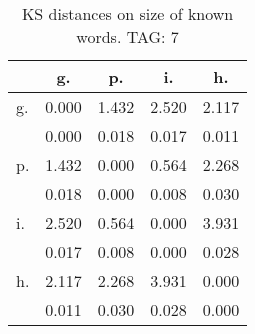 \begin{table}[h!]
\begin{center}
\begin{tabular}{| l | c | c | c | c |}\hline
 & g. & p. & i. & h. \\\hline
g. & 0.000  & 1.432  & 2.520  & 2.117 \\\hline
 & 0.000  & 0.018  & 0.017  & 0.011 \\\hline
p. & 1.432  & 0.000  & 0.564  & 2.268 \\\hline
 & 0.018  & 0.000  & 0.008  & 0.030 \\\hline
i. & 2.520  & 0.564  & 0.000  & 3.931 \\\hline
 & 0.017  & 0.008  & 0.000  & 0.028 \\\hline
h. & 2.117  & 2.268  & 3.931  & 0.000 \\\hline
 & 0.011  & 0.030  & 0.028  & 0.000 \\\hline
\end{tabular}
\caption{KS distances on size of known words. TAG: 7}
\end{center}
\end{table}